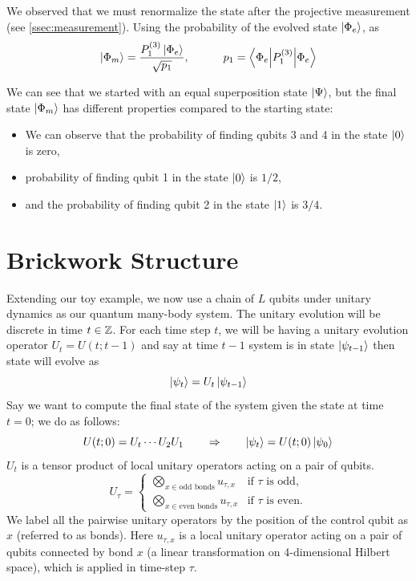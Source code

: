 \documentclass[11pt, oneside, listof=totoc]{scrbook}
\renewcommand{\d}{1}
\newcommand{\ku}{\ket{0}}
\newcommand{\kd}{\ket{1}}
\begin{document}
We observed that we must renormalize the state after the projective measurement (see \cref{ssec:measurement}). Using the probability of the evolved state \(\ket{\Phi_e}\), as
\begin{equation*}
    \ket{\Phi_m} = \frac{P_{\d}^{(3)} \ket{\Phi_e}}{\sqrt{p_1}}, \qquad \quad p_1 = \ev**{P_{\d}^{(3)}}{\Phi_e}
\end{equation*}

We can see that we started with an equal superposition state \(\ket{\Psi}\), but the final state \(\ket{\Phi_m}\) has different properties compared to the starting state:
\begin{itemize}
    \item We can observe that the probability of finding qubits 3 and 4 in the state \(\ku\) is zero,
    \item probability of finding qubit 1 in the state \(\ku\) is \(1/2\),
    \item and the probability of finding qubit 2 in the state \(\kd\) is \(3/4\).
\end{itemize}


\section{Brickwork Structure}\label{sec:brickwork}

Extending our toy example, we now use a chain of \(L\) qubits under unitary dynamics as our quantum many-body system. The unitary evolution will be discrete in time \(t \in \mathbb Z\). For each time step \(t\), we will be having a unitary evolution operator \(U_t = U(t; t-1)\) and say at time \(t-1\) system is in state \(\ket{\psi_{t-1}}\) then state will evolve as
\begin{equation}
    \ket{\psi_t} = U_t \ket{\psi_{t-1}}
\end{equation}
Say we want to compute the final state of the system given the state at time \(t = 0\); we do as follows:
\begin{equation}
    U(t; 0) = U_t \cdots U_2 U_1 \qquad \Rightarrow \qquad \ket{\psi_t} = U(t; 0) \ket{\psi_0}
\end{equation}
\(U_t\) is a tensor product of local unitary operators acting on a pair of qubits.
\begin{equation}
    U_{\tau} = \begin{cases}
        \bigotimes\limits_{x \in \text{odd bonds}} u_{\tau, x}  & \text{if $\tau$ is odd},  \\[3ex]
        \bigotimes\limits_{x \in \text{even bonds}} u_{\tau, x} & \text{if $\tau$ is even}.
    \end{cases}
\end{equation}
We label all the pairwise unitary operators by the position of the control qubit as \(x\) (referred to as bonds). Here \(u_{\tau, x}\) is a local unitary operator acting on a pair of qubits connected by bond \(x\) (\ie a linear transformation on 4-dimensional Hilbert space), which is applied in time-step \(\tau\).\cite{Fisher2023}
\end{document}
